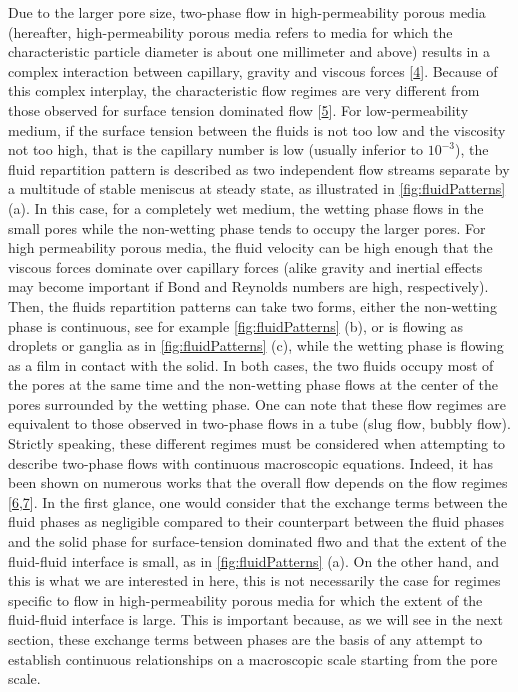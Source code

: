 \documentclass[]{article}
\begin{document}
Due to the larger pore size, two-phase flow in high-permeability porous
media (hereafter, high-permeability porous media refers to media for
which the characteristic particle diameter is about one millimeter and
above) results in a complex interaction between capillary, gravity and
viscous forces {[}\protect\hyperlink{ref-davit2018one}{4}{]}. Because of
this complex interplay, the characteristic flow regimes are very
different from those observed for surface tension dominated flow
{[}\protect\hyperlink{ref-dullien2012porous}{5}{]}. For low-permeability
medium, if the surface tension between the fluids is not too low and the
viscosity not too high, that is the capillary number is low (usually
inferior to \(10^{-3}\)), the fluid repartition pattern is described as
two independent flow streams separate by a multitude of stable meniscus
at steady state, as illustrated in \cref{fig:fluidPatterns} (a). In this
case, for a completely wet medium, the wetting phase flows in the small
pores while the non-wetting phase tends to occupy the larger pores. For
high permeability porous media, the fluid velocity can be high enough
that the viscous forces dominate over capillary forces (alike gravity
and inertial effects may become important if Bond and Reynolds numbers
are high, respectively). Then, the fluids repartition patterns can take
two forms, either the non-wetting phase is continuous, see for example
\cref{fig:fluidPatterns} (b), or is flowing as droplets or ganglia as in
\cref{fig:fluidPatterns} (c), while the wetting phase is flowing as a
film in contact with the solid. In both cases, the two fluids occupy
most of the pores at the same time and the non-wetting phase flows at
the center of the pores surrounded by the wetting phase. One can note
that these flow regimes are equivalent to those observed in two-phase
flows in a tube (slug flow, bubbly flow). Strictly speaking, these
different regimes must be considered when attempting to describe
two-phase flows with continuous macroscopic equations. Indeed, it has
been shown on numerous works that the overall flow depends on the flow
regimes
{[}\protect\hyperlink{ref-Avraam1995a}{6},\protect\hyperlink{ref-armstrong2016beyond}{7}{]}.
In the first glance, one would consider that the exchange terms between
the fluid phases as negligible compared to their counterpart between the
fluid phases and the solid phase for surface-tension dominated flwo and
that the extent of the fluid-fluid interface is small, as in
\cref{fig:fluidPatterns} (a). On the other hand, and this is what we are
interested in here, this is not necessarily the case for regimes
specific to flow in high-permeability porous media for which the extent
of the fluid-fluid interface is large. This is important because, as we
will see in the next section, these exchange terms between phases are
the basis of any attempt to establish continuous relationships on a
macroscopic scale starting from the pore scale.
\end{document}
